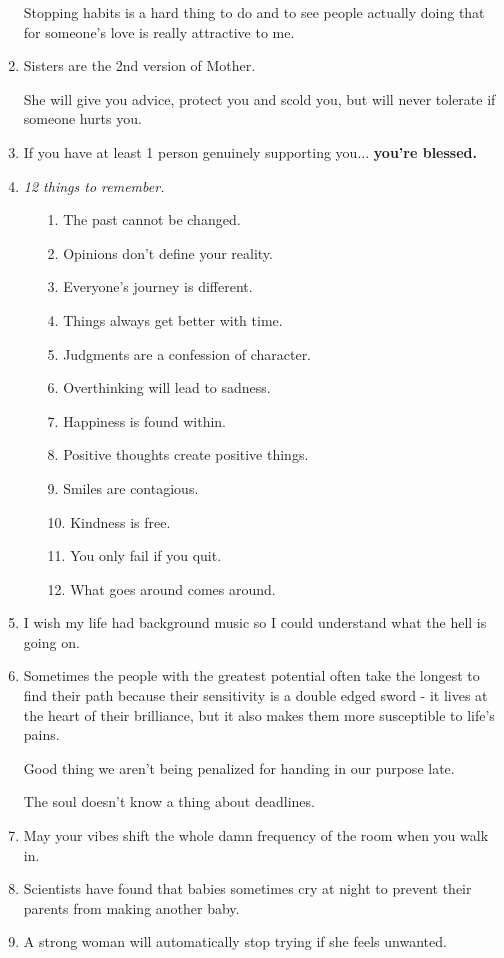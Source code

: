 \documentclass{article}
\numberwithin{equation}{section}
\begin{document}
\begin{enumerate}
    Stopping habits is a hard thing to do and to see people actually doing that for someone's love is really attractive to me.
    \item Sisters are the 2nd version of Mother.
    
    She will give you advice, protect you and scold you, but will never tolerate if someone hurts you.
    \item If you have at least 1 person genuinely supporting you$\ldots$ \textbf{you're blessed.}
    \item \textit{12 things to remember.}
    \begin{itemize}
        \item[1.] The past cannot be changed.
        \item[2.] Opinions don't define your reality.
        \item[3.] Everyone's journey is different.
        \item[4.] Things always get better with time.
        \item[5.] Judgments are a confession of character.
        \item[6.] Overthinking will lead to sadness.
        \item[7.] Happiness is found within.
        \item[8.] Positive thoughts create positive things.
        \item[9.] Smiles are contagious.
        \item[10.] Kindness is free.
        \item[11.] You only fail if you quit.
        \item[12.] What goes around comes around.
    \end{itemize}
    \item I wish my life had background music so I could understand what the hell is going on.
    \item Sometimes the people with the greatest potential often take the longest to find their path because their sensitivity is a double edged sword - it lives at the heart of their brilliance, but it also makes them more susceptible to life's pains.
    
    Good thing we aren't being penalized for handing in our purpose late.
    
    The soul doesn't know a thing about deadlines.
    \item May your vibes shift the whole damn frequency of the room when you walk in.
    \item Scientists have found that babies sometimes cry at night to prevent their parents from making another baby.
    \item A strong woman will automatically stop trying if she feels unwanted.
    

\end{enumerate}
\end{document}

